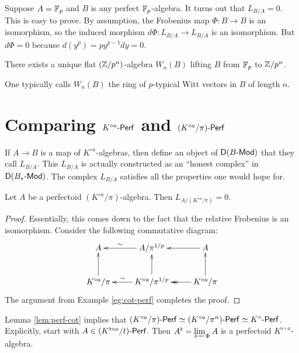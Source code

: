\documentclass{article}
\begin{document}
\begin{example}\label{eg:cot-perf}
Suppose $A=\mathbb{F}_p$ and $B$ is any perfect $\mathbb{F}_p$-algebra. It turns out that 
$L_{B/A}=0$. This is easy to prove. By assumption, the Frobenius map 
$\Phi:B\to B$ is an isomorphism, so the induced morphism 
$d\Phi:L_{B/A} \to L_{B/A}$ is an isomorphism. But $d\Phi=0$ because 
$d(y^p) = p y^{p-1} d y = 0$. 
\end{example}

\begin{corollary}
There exists a unique flat $(\mathbb{Z}/p^n)$-algebra $W_n(B)$ lifting $B$ from 
$\mathbb{F}_p$ to $\mathbb{Z}/p^n$. 
\end{corollary}

One typically calls $W_n(B)$ the ring of $p$-typical Witt vectors in $B$ 
of length $n$. 





\section{Comparing $K^{\circ a}\textnormal{-}\mathsf{Perf}$ and $(K^{\circ a}/\pi)\textnormal{-}\mathsf{Perf}$}

If $A\to B$ is a map of $K^{\circ a}$-algebras, then \cite{gr03} define 
an object of $\mathsf D(B\textnormal{-}\mathsf{Mod})$ that they call $L_{B/A}$. This $L_{B/A}$ is actually 
constructed as an ``honest complex'' in $\mathsf D(B_\ast\textnormal{-}\mathsf{Mod})$. The complex 
$L_{B/A}$ satisfies all the properties one would hope for. 

\begin{lemma}\label{lem:perf-cot}
Let $A$ be a perfectoid $(K^{\circ a}/\pi)$-algebra. Then 
$L_{A/(K^{\circ a}/\pi)}=0$. 
\end{lemma}
\begin{proof}
Essentially, this comes down to the fact that the relative Frobenius is an 
isomorphism. Consider the following commutative diagram:
\[\xymatrix{
  A 
    & A/\pi^{1/p} \ar[l]_-\sim
    & A \ar[l] \\
  K^{\circ a}/\pi \ar[u] 
    & K^{\circ a}/\pi^{1/p} \ar[l]_-\sim \ar[u] 
    & K^{\circ a}/\pi \ar[u] \ar@{->>}[l] 
}\]
The argument from Example \ref{eg:cot-perf} completes the proof. 
\end{proof}

Lemma \ref{lem:perf-cot} implies that 
$(K^{\circ a}/\pi)\textnormal{-}\mathsf{Perf} \simeq (K^{\circ a}/\pi^n)\textnormal{-}\mathsf{Perf} \simeq K^{\circ }\textnormal{-}\mathsf{Perf}$. 
Explicitly, start with $A\in (K^{\flat \circ a}/t)\textnormal{-}\mathsf{Perf}$. Then 
$A^\flat = \varprojlim_\Phi A$ is a perfectoid $K^{\flat\circ a}$-algebra. 
\end{document}
